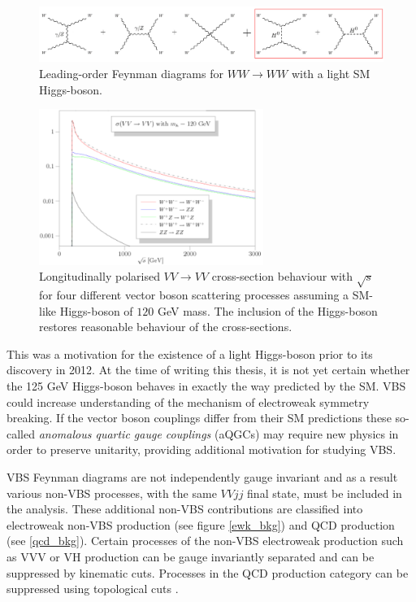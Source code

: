 \begin{figure}
\centering
\includegraphics[width=1.\textwidth]{images/ssWW/new_ww_scatt_diags.png}
\caption{Leading-order Feynman diagrams for $WW \longrightarrow WW$ with a light SM Higgs-boson.}
\label{new_ww_scatt_diags}
\end{figure}
\begin{figure}
\centering
\includegraphics[width=0.65\textwidth]{images/ssWW/x-section_lon_pol_scatt_with_higgs.png}
\caption{Longitudinally polarised $VV \longrightarrow VV$ cross-section behaviour with $\sqrt{s}$ for four different vector boson scattering processes assuming a SM-like Higgs-boson of $120$ GeV mass. The inclusion of the Higgs-boson restores reasonable behaviour of the cross-sections. \cite{Alboteanu}}
\label{x-section_lon_pol_scatt_with_higgs}
\end{figure}

This was a motivation for the existence of a light Higgs-boson prior to its discovery in 2012. At the time of writing this thesis, it is not yet certain whether the 125 GeV Higgs-boson behaves in exactly the way predicted by the SM. VBS could increase understanding of the mechanism of electroweak symmetry breaking. If the vector boson couplings differ from their SM predictions these so-called \emph{anomalous quartic gauge couplings} (aQGCs) may require new physics in order to preserve unitarity, providing additional motivation for studying VBS.

VBS Feynman diagrams are not independently gauge invariant and as a result various non-VBS processes, with the same $VVjj$ final state, must be included in the analysis. These additional non-VBS contributions are classified into electroweak non-VBS production (see figure \ref{ewk_bkg}) and QCD production (see \ref{qcd_bkg}). Certain processes of the non-VBS electroweak production such as VVV or VH production can be gauge invariantly separated and can be suppressed by kinematic cuts. Processes in the QCD production category can be suppressed using topological cuts \cite{ssWW}.

